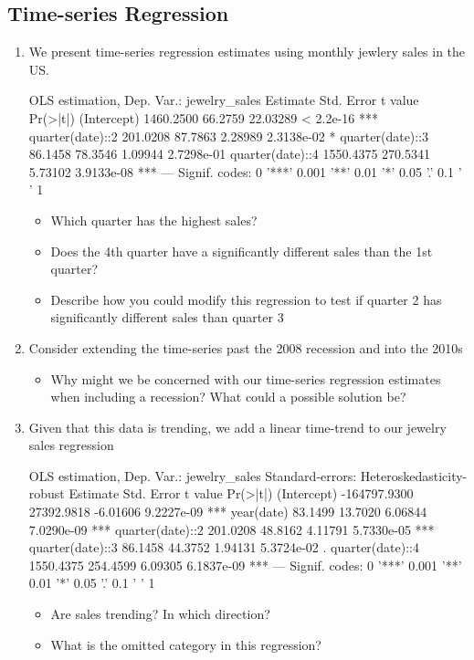 \documentclass[12pt]{article}
\begin{document}
\subsection*{Time-series Regression}
\begin{enumerate}
  \item We present time-series regression estimates using monthly jewlery sales in the US. 

  \begin{codeblock}[{}]
OLS estimation, Dep. Var.: jewelry_sales
                  Estimate Std. Error  t value   Pr(>|t|)    
(Intercept)      1460.2500    66.2759 22.03289  < 2.2e-16 ***
quarter(date)::2  201.0208    87.7863  2.28989 2.3138e-02 *  
quarter(date)::3   86.1458    78.3546  1.09944 2.7298e-01    
quarter(date)::4 1550.4375   270.5341  5.73102 3.9133e-08 ***
---
Signif. codes:  0 '***' 0.001 '**' 0.01 '*' 0.05 '.' 0.1 ' ' 1
  \end{codeblock}

  \begin{itemize}
    \item Which quarter has the highest sales? 
    
    \item Does the 4th quarter have a significantly different sales than the 1st quarter? 
    
    \item Describe how you could modify this regression to test if quarter 2 has significantly different sales than quarter 3
  \end{itemize}


  \item Consider extending the time-series past the 2008 recession and into the 2010s
  \begin{itemize}
    \item Why might we be concerned with our time-series regression estimates when including a recession? What could a possible solution be?
  \end{itemize}

  \item Given that this data is trending, we add a linear time-trend to our jewelry sales regression

  \begin{codeblock}[{}]
OLS estimation, Dep. Var.: jewelry_sales
Standard-errors: Heteroskedasticity-robust 
                     Estimate Std. Error  t value   Pr(>|t|)    
(Intercept)      -164797.9300 27392.9818 -6.01606 9.2227e-09 ***
year(date)            83.1499    13.7020  6.06844 7.0290e-09 ***
quarter(date)::2     201.0208    48.8162  4.11791 5.7330e-05 ***
quarter(date)::3      86.1458    44.3752  1.94131 5.3724e-02 .  
quarter(date)::4    1550.4375   254.4599  6.09305 6.1837e-09 ***
---
Signif. codes:  0 '***' 0.001 '**' 0.01 '*' 0.05 '.' 0.1 ' ' 1
  \end{codeblock}

  \begin{itemize}
    \item Are sales trending? In which direction?
    
    \item What is the omitted category in this regression? 
  \end{itemize}

\end{enumerate}
\end{document}
